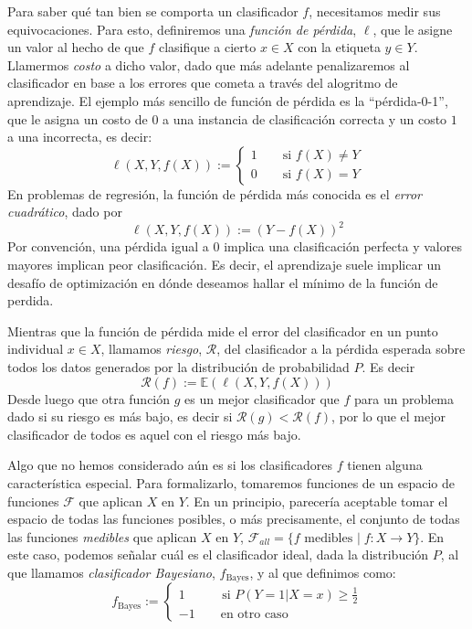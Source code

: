 \documentclass{article}
\begin{document}
Para saber qué tan bien se comporta un clasificador $f$, necesitamos medir sus equivocaciones. Para esto, definiremos una \textit{función de pérdida},
$\ell$, que le asigne un valor al hecho de que $f$ clasifique a cierto $x\in X$ con la etiqueta $y\in Y$. Llamermos \textit{costo} a dicho valor, 
dado que más adelante penalizaremos al clasificador en base a los errores que cometa a través del alogritmo de aprendizaje.\newline
El ejemplo más sencillo de función de pérdida es la ``pérdida-0-1'', que le asigna un costo de $0$ a una instancia de clasificación correcta y un costo
$1$ a una incorrecta, es decir:
\[
\ell(X,Y,f(X)):= \begin{cases}
    1 \qquad \text{si } f(X) \neq Y \\
    0 \qquad \text{si } f(X) = Y
\end{cases}
\]
En problemas de regresión, la función de pérdida más conocida es el \textit{error cuadrático}, dado por
\[
\ell(X,Y,f(X)):= (Y-f(X))^2
\]
Por convención, una pérdida igual a $0$ implica una clasificación perfecta y valores mayores implican peor clasificación. Es decir,
el aprendizaje suele implicar un desafío de optimización en dónde deseamos hallar el mínimo de la función de perdida.

Mientras que la función de pérdida mide el error del clasificador en un punto individual $x\in X$, llamamos \textit{riesgo}, $\mathcal{R}$, 
del clasificador a la pérdida esperada sobre todos los datos generados por la distribución de probabilidad $P$. Es decir
\[
\mathcal{R}(f) := \mathbb{E}\left( \ell(X,Y,f(X)) \right)
\]
Desde luego que otra función $g$ es un mejor clasificador que $f$ para un problema dado si su riesgo es más bajo, es decir si $\mathcal{R}(g)
< \mathcal{R}(f)$, por lo que el mejor clasificador de todos es aquel con el riesgo más bajo.

Algo que no hemos considerado aún es si los clasificadores $f$ tienen alguna característica especial. Para formalizarlo, tomaremos funciones de un
espacio de funciones $\mathcal{F}$ que aplican $X$ en $Y$. En un principio, parecería aceptable tomar el espacio de todas las funciones posibles, o 
más precisamente, el conjunto de todas las funciones \textit{medibles} que aplican $X$ en $Y$, $\mathcal{F}_{all} = \{f \text{ medibles  } | 
\; f: X \rightarrow Y \}$. En este caso, podemos señalar cuál es el clasificador ideal, dada la distribución $P$, al que llamamos
\textit{clasificador Bayesiano}, $f_{\text{Bayes}}$, y al que definimos como:
\[
f_{\text{Bayes}} := \begin{cases}
1 \qquad \; \; \text{  si } P(Y=1 | X=x) \geq \frac{1}{2}\\
-1 \qquad \text{en otro caso }
\end{cases}
\]
\end{document}
